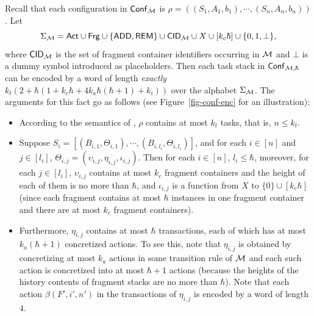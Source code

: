 Recall that each configuration in ${\mathsf{Conf} }_{{\mathcal{M} }}$ is 
$\rho=((S_1,A_1,b_1), \cdots, (S_n,A_n,b_n))$.
Let 
%
$$\Sigma_{{\mathcal{M} }} = {\sf Act} \cup {\sf Frg} \cup \{\mathsf{ADD}, \mathsf{REM}\} \cup  {\sf CID}_{\mathcal{M} } \cup X \cup [k_c\hbar]  \cup \{0,1, \bot\},$$ 
%
where ${\sf CID}_{\mathcal{M} }$ is the set of fragment container identifiers occurring in ${\mathcal{M} }$ and $\bot$ is a dummy symbol introduced as placeholders. 
Then each task stack in ${\mathsf{Conf} }_{{\mathcal{M} }, \hbar}$ can be encoded by a word of length \emph{exactly} 
%
$k_t(2+\hbar (1+k_c \hbar + 4k_a \hbar(\hbar+1)+k_i))$
%
over the alphabet $\Sigma_{{\mathcal{M} }}$.
The arguments for this fact go as follows (see Figure~\ref{fig-conf-enc} for an illustration): 
\begin{itemize}
\item According to the semantics of {\AMASS}, $\rho$ contains at most $k_t$ tasks, that is, $n \le k_t$.  
%
\item Suppose $S_i = [(B_{i,1}, \Theta_{i,1}), \cdots, (B_{i, l_i}, \Theta_{i, l_i})]$, and for each $i \in [n]$ and $j \in [l_i]$, $\Theta_{i, j} = (\upsilon_{i,j}, \eta_{i,j}, \iota_{i,j})$. Then for each $i \in [n]$, $l_i \le \hbar$, moreover, for each $j \in [l_i]$, $\upsilon_{i,j}$ contains at most $k_c$ fragment containers and the height of each of them is no more than $\hbar$, and $\iota_{i,j}$ is a function from $X$ to $\{0\} \cup [k_c\hbar]$ (since each fragment contains at most $\hbar$ instances in one fragment container and there are at most $k_c$ fragment containers). 
%
\item Furthermore, $\eta_{i,j}$ contains at most $\hbar$ transactions, each of which has at most $k_a(\hbar+1)$ concretized actions. To see this, note that $\eta_{i,j}$ is obtained by concretizing at most $k_a$ actions in some transition rule of ${\mathcal{M} }$ and each such action is concretized into at most $\hbar + 1$ actions (because the heights of the history contents of fragment stacks are no more than $\hbar$). Note that each action $\beta(F', i', n')$ in the transactions of $\eta_{i,j}$ is encoded by a word of length $4$.
\end{itemize}
%
